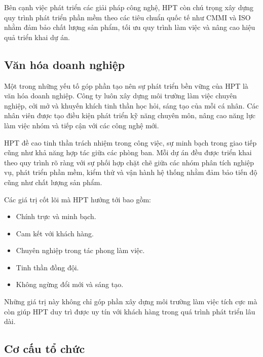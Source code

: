 Bên cạnh việc phát triển các giải pháp công nghệ, HPT còn chú trọng xây dựng quy trình phát triển phần mềm theo các tiêu chuẩn quốc tế như CMMI và ISO nhằm đảm bảo chất lượng sản phẩm, tối ưu quy trình làm việc và nâng cao hiệu quả triển khai dự án.


\subsection{Văn hóa doanh nghiệp}

Một trong những yếu tố góp phần tạo nên sự phát triển bền vững của HPT là văn hóa doanh nghiệp. Công ty luôn xây dựng môi trường làm việc chuyên nghiệp, cởi mở và khuyến khích tinh thần học hỏi, sáng tạo của mỗi cá nhân. Các nhân viên được tạo điều kiện phát triển kỹ năng chuyên môn, nâng cao năng lực làm việc nhóm và tiếp cận với các công nghệ mới.

HPT đề cao tinh thần trách nhiệm trong công việc, sự minh bạch trong giao tiếp cũng như khả năng hợp tác giữa các phòng ban. Mỗi dự án đều được triển khai theo quy trình rõ ràng với sự phối hợp chặt chẽ giữa các nhóm phân tích nghiệp vụ, phát triển phần mềm, kiểm thử và vận hành hệ thống nhằm đảm bảo tiến độ cũng như chất lượng sản phẩm.

Các giá trị cốt lõi mà HPT hướng tới bao gồm:

\begin{itemize}
    \item Chính trực và minh bạch.
    \item Cam kết với khách hàng.
    \item Chuyên nghiệp trong tác phong làm việc.
    \item Tinh thần đồng đội.
    \item Không ngừng đổi mới và sáng tạo.
\end{itemize}

Những giá trị này không chỉ góp phần xây dựng môi trường làm việc tích cực mà còn giúp HPT duy trì được uy tín với khách hàng trong quá trình phát triển lâu dài.

\subsection{Cơ cấu tổ chức}

